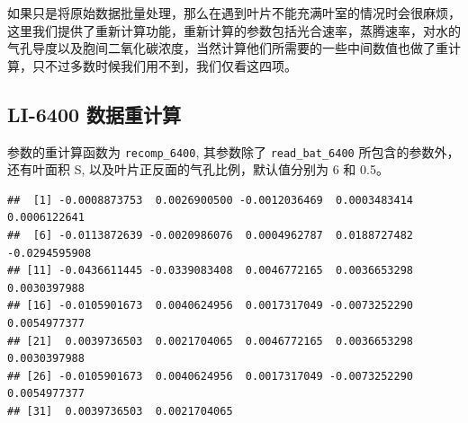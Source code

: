 \documentclass[
]{krantz}
\makeatletter
\newenvironment{Shaded}{\begin{snugshade}}{\end{snugshade}}
\newcommand{\DataTypeTok}[1]{\textcolor[rgb]{0.13,0.29,0.53}{#1}}
\newcommand{\DecValTok}[1]{\textcolor[rgb]{0.00,0.00,0.81}{#1}}
\newcommand{\FloatTok}[1]{\textcolor[rgb]{0.00,0.00,0.81}{#1}}
\newcommand{\KeywordTok}[1]{\textcolor[rgb]{0.13,0.29,0.53}{\textbf{#1}}}
\newcommand{\NormalTok}[1]{#1}
\newcommand{\OperatorTok}[1]{\textcolor[rgb]{0.81,0.36,0.00}{\textbf{#1}}}
\newcommand{\StringTok}[1]{\textcolor[rgb]{0.31,0.60,0.02}{#1}}
\newenvironment{kframe}{%
\medskip{}
\setlength{\fboxsep}{.8em}
 \def\at@end@of@kframe{}%
 \ifinner\ifhmode%
  \def\at@end@of@kframe{\end{minipage}}%
  \begin{minipage}{\columnwidth}%
 \fi\fi%
 \def\FrameCommand##1{\hskip\@totalleftmargin \hskip-\fboxsep
 \colorbox{shadecolor}{##1}\hskip-\fboxsep
     \hskip-\linewidth \hskip-\@totalleftmargin \hskip\columnwidth}%
 \MakeFramed {\advance\hsize-\width
   \@totalleftmargin\z@ \linewidth\hsize
   \@setminipage}}%
 {\par\unskip\endMakeFramed%
 \at@end@of@kframe}
\renewenvironment{Shaded}{\begin{kframe}}{\end{kframe}}
\makeatother
\begin{document}
如果只是将原始数据批量处理，那么在遇到叶片不能充满叶室的情况时会很麻烦，这里我们提供了重新计算功能，重新计算的参数包括光合速率，蒸腾速率，对水的气孔导度以及胞间二氧化碳浓度，当然计算他们所需要的一些中间数值也做了重计算，只不过多数时候我们用不到，我们仅看这四项。

\hypertarget{recompute6400}{%
\subsection{LI-6400 数据重计算}\label{recompute6400}}

参数的重计算函数为 \texttt{recomp\_6400}, 其参数除了 \texttt{read\_bat\_6400} 所包含的参数外，还有叶面积 S, 以及叶片正反面的气孔比例，默认值分别为 6 和 0.5。

\begin{Shaded}
\end{Shaded}

\begin{verbatim}
##  [1] -0.0008873753  0.0026900500 -0.0012036469  0.0003483414  0.0006122641
##  [6] -0.0113872639 -0.0020986076  0.0004962787  0.0188727482 -0.0294595908
## [11] -0.0436611445 -0.0339083408  0.0046772165  0.0036653298  0.0030397988
## [16] -0.0105901673  0.0040624956  0.0017317049 -0.0073252290  0.0054977377
## [21]  0.0039736503  0.0021704065  0.0046772165  0.0036653298  0.0030397988
## [26] -0.0105901673  0.0040624956  0.0017317049 -0.0073252290  0.0054977377
## [31]  0.0039736503  0.0021704065
\end{verbatim}

\begin{Shaded}
\end{Shaded}
\end{document}
